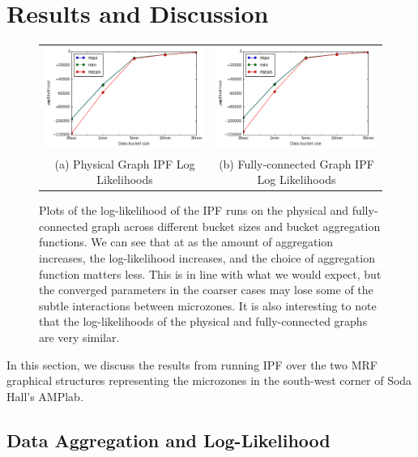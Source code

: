 \section{Results and Discussion}

\begin{figure}[h]
\centering
\begin{tabular}{cc}
\includegraphics[width=.4\linewidth]{figs/physical_loglikelihood} & \includegraphics[width=.4\linewidth]{figs/full_loglikelihood} \\
(a) Physical Graph IPF Log Likelihoods & (b) Fully-connected Graph IPF Log Likelihoods \\[6pt]
\end{tabular}
\caption{Plots of the log-likelihood of the IPF runs on the physical and fully-connected graph across different bucket sizes and bucket aggregation functions. We can see that at as the amount of aggregation increases, the log-likelihood increases, and the choice of aggregation function matters less. This is in line with what we would expect, but the converged parameters in the coarser cases may lose some of the subtle interactions between microzones.
It is also interesting to note that the log-likelihoods of the physical and fully-connected graphs are very similar.}
\label{fig:loglikelihood}
\end{figure}

In this section, we discuss the results from running IPF over the two MRF graphical structures representing the microzones in the south-west corner of Soda Hall's AMPlab.

\subsection{Data Aggregation and Log-Likelihood}


